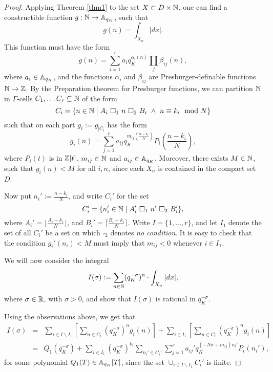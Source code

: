 \begin{proof}


Applying Theorem \ref{thm1} to the set $X \subset D\times \NN$, one can find a constructible function $g: \NN \to \AA_{q_K}$, such that
\[g(n) = \int_{X_n}|dx|.\]
This function must have the form 
\[g(n) = \sum_{i=1}^r a_iq_K^{\alpha_i(n)}\prod_j\beta_{ij}(n),\]
where $a_i \in \AA_{q_K}$, and the functions $\alpha_i$ and $\beta_{ij}$ are Presburger-definable functions $\NN \to \ZZ$. By the Preparation theorem for Presburger functions, we can partition $\N$ in $\Gamma$-cells $C_1, \ldots C_r \subseteq \N$ of the form
\[C_i = \{ n \in \N \mid A_i \ \square_1 \ n \ \square_2\ B_i \ \wedge\ n \equiv k_i \mod N \}\]
 such that on each part $g_i:= g_{|C_i}$ has the form 
\[g_i(n) = \sum_{j=1}^r a_{ij}q_K^{m_{ij}(\frac{n-k_i}{N})}P_i\left(\frac{n-k_i}{N}\right),\]
where $P_i(t)$ is in $\Z[t]$, $m_{ij} \in \N$ and $a_{ij} \in \AA_{q_K}$. Moreover, there exists $M \in \N$, such that $g_i(n) <M$ for all $i,n$, since each $X_n$ is contained in the compact set $D$.
 
Now put $n_i' := \frac{n-k_i}{N}$, and write $C_i'$ for the set
\[C_i'=\{n_i'\in \N \mid A_i'\ \square_1 \ n' \ \square_2 \ B_i'\},\]
where $A_i' =\lfloor \frac{A_i-k_i}{N}\rfloor$, and $B_i' =\lceil \frac{B_i-k_i}{N}\rceil$. Write $I = \{1, \ldots, r\}$, and let $I_1$ denote the set of all $C_i'$ be a set on which $\square_2$ denotes \emph{no condition}. It is easy to check that the condition $g_i'(n_i) <M$ must imply that $m_{ij}<0$ whenever $i \in I_1$.  

We will now consider the integral
\[I(\sigma):=\sum_{n\in\NN}(q_K^{-\sigma})^{n}\cdot \int_{X_n}|dx|,\] 
where $\sigma \in \RR$, with $\sigma>0$, and show that $I(\sigma)$ is rational in $q_K^{-\sigma}$.

Using the observations above, we get that
\begin{eqnarray*}
I(\sigma) %
&=& \sum_{i\in I\backslash I_1}\left[ \sum_{n \in C_i} (q_K^{-\sigma})^{n}g_i(n)\right] + \sum_{i\in I_1}\left[ \sum_{n \in C_i} (q_K^{-\sigma})^{n}g_i(n)\right]\\
&=&Q_1(q_K^{-\sigma}) +\sum_{i \in I_1 }(q_K^{-\sigma})^{k_i} \sum_{n_i' \in C_i'}\sum_{j=1}^r a_{ij}'q_K^{(-N\sigma +m_{ij})n_i'}P_i(n_i'),
\end{eqnarray*}
for some polynomial $Q_1(T) \in \AA_{q_K}[T]$, since the set $\cup_{i\in I\backslash I_1} C_i'$ is finite.


\end{proof}
